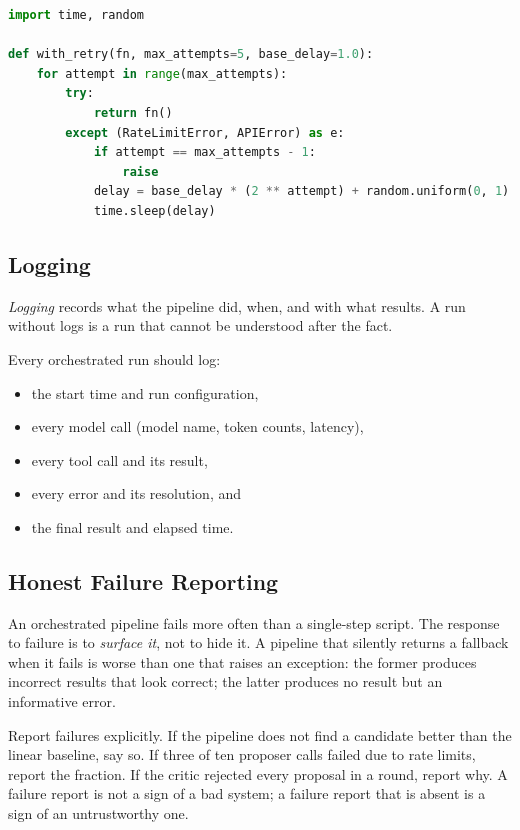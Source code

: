 \begin{lstlisting}[language=python]
import time, random

def with_retry(fn, max_attempts=5, base_delay=1.0):
    for attempt in range(max_attempts):
        try:
            return fn()
        except (RateLimitError, APIError) as e:
            if attempt == max_attempts - 1:
                raise
            delay = base_delay * (2 ** attempt) + random.uniform(0, 1)
            time.sleep(delay)
\end{lstlisting}

\subsection{Logging}

\emph{Logging} records what the pipeline did, when, and with what results.
A run without logs is a run that cannot be understood after the fact.

Every orchestrated run should log:
\begin{itemize}
\item the start time and run configuration,
\item every model call (model name, token counts, latency),
\item every tool call and its result,
\item every error and its resolution, and
\item the final result and elapsed time.
\end{itemize}

\subsection{Honest Failure Reporting}

An orchestrated pipeline fails more often than a single-step script.
The response to failure is to \emph{surface it}, not to hide it.
A pipeline that silently returns a fallback when it fails is worse than one that raises an exception: the former produces incorrect results that look correct; the latter produces no result but an informative error.

\begin{principle}
\label{principle:HonestFailure}
Report failures explicitly.
If the pipeline does not find a candidate better than the linear baseline, say so.
If three of ten proposer calls failed due to rate limits, report the fraction.
If the critic rejected every proposal in a round, report why.
A failure report is not a sign of a bad system; a failure report that is absent is a sign of an untrustworthy one.
\end{principle}

